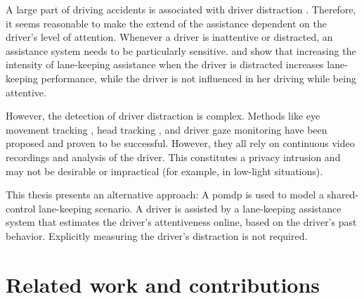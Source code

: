 A large part of driving accidents is associated with driver distraction \parencite{distracted_nhtsa}. Therefore, it seems reasonable to make the extend of the assistance dependent on the driver's level of attention. Whenever a driver is inattentive or distracted, an assistance system needs to be particularly sensitive. \cite{disracted-lane-keeping-1} and \cite{disracted-lane-keeping-2} show that increasing the intensity of lane-keeping assistance when the driver is distracted increases lane-keeping performance, while the driver is not influenced in her driving while being attentive. 

However, the detection of driver distraction is complex. Methods like eye movement tracking \parencite{eye-movement}, head tracking \parencite{head-tracking}, and driver gaze monitoring \parencite{gaze-monitoring} have been proposed and proven to be successful. However, they all rely on continuous video recordings and analysis of the driver. This constitutes a privacy intrusion and may not be desirable or impractical (for example, in low-light situations). 





This thesis presents an alternative approach: A \Gls{pomdp} is used to model a shared-control lane-keeping scenario. A driver is assisted by a lane-keeping assistance system that estimates the driver's attentiveness online, based on the driver's past behavior. Explicitly measuring the driver's distraction is not required.



\section{Related work and contributions}


